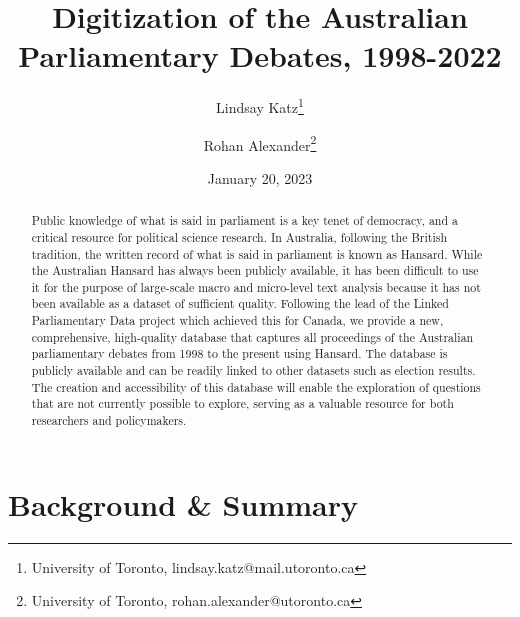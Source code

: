 \documentclass[
  letterpaper,
  DIV=11,
  numbers=noendperiod]{scrartcl}
\title{Digitization of the Australian Parliamentary Debates, 1998-2022}
\author{Lindsay Katz\footnote{University of Toronto,
  lindsay.katz@mail.utoronto.ca} \and Rohan Alexander\footnote{University
  of Toronto, rohan.alexander@utoronto.ca}}
\date{January 20, 2023}
\begin{document}
\maketitle
\begin{abstract}
Public knowledge of what is said in parliament is a key tenet of
democracy, and a critical resource for political science research. In
Australia, following the British tradition, the written record of what
is said in parliament is known as Hansard. While the Australian Hansard
has always been publicly available, it has been difficult to use it for
the purpose of large-scale macro and micro-level text analysis because
it has not been available as a dataset of sufficient quality. Following
the lead of the Linked Parliamentary Data project which achieved this
for Canada, we provide a new, comprehensive, high-quality database that
captures all proceedings of the Australian parliamentary debates from
1998 to the present using Hansard. The database is publicly available
and can be readily linked to other datasets such as election results.
The creation and accessibility of this database will enable the
exploration of questions that are not currently possible to explore,
serving as a valuable resource for both researchers and policymakers.
\end{abstract}
\ifdefined\Shaded\renewenvironment{Shaded}{\begin{tcolorbox}[enhanced, breakable, borderline west={3pt}{0pt}{shadecolor}, sharp corners, interior hidden, boxrule=0pt, frame hidden]}{\end{tcolorbox}}\fi

\hypertarget{sec-intro}{%
\section{Background \& Summary}\label{sec-intro}}
\end{document}
